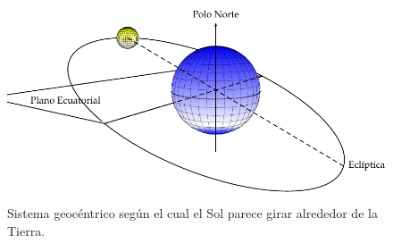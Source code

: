 %
\begin{figure}
\includegraphics[scale=0.9]{../figs/SoldesdeTierra}

\caption{Sistema geocéntrico según el cual el Sol parece girar alrededor de
la Tierra.\label{fig:ModeloGeocentrico}}

\end{figure}


